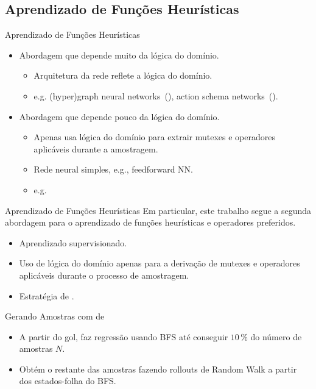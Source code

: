 \documentclass{beamer}
\begin{document}
\subsection{Aprendizado de Funções Heurísticas}
\begin{frame}{Aprendizado de Funções Heurísticas}
\begin{itemize}
  \item Abordagem que depende \alert{muito} da lógica do domínio.
    \begin{itemize}
      \item Arquitetura da rede reflete a lógica do domínio.
      \item e.g. (hyper)graph neural networks~(\cite{Shen.etal/2020,Stahlberg.etal/2022}), action schema networks~(\cite{Toyer.etal/2018,Toyer.etal/2020}).
    \end{itemize}
  \pause
  \item Abordagem que depende \alert{pouco} da lógica do domínio.
    \begin{itemize}
      \item Apenas usa lógica do domínio para extrair mutexes e operadores aplicáveis durante a amostragem.
      \item Rede neural simples, e.g., feedforward NN.
      \item e.g.~\cite{Ferber.etal/2020a,Yu.etal/2020,Ferber.etal/2022,OToole/2022,Bettker.etal/2022}
    \end{itemize}
\end{itemize}
\end{frame}

\begin{frame}{Aprendizado de Funções Heurísticas}
Em particular, este trabalho segue a \alert{segunda abordagem} para o aprendizado de funções heurísticas e operadores preferidos.
\begin{itemize}
  \item Aprendizado supervisionado.
  \item Uso de lógica do domínio apenas para a derivação de mutexes e operadores aplicáveis durante o processo de amostragem.
  \item Estratégia de \alert{\cite{Bettker.etal/2022}}.
\end{itemize}
\end{frame}

\begin{frame}{Gerando Amostras com \bfsrw de \cite{Bettker.etal/2022}}
\begin{itemize}
  \item A partir do gol, faz \alert{regressão} usando \alert{BFS} até conseguir $10\,\%$ do número de amostras $N$.
  \pause
  \item Obtém o restante das amostras fazendo rollouts de \alert{Random Walk} a partir dos \alert{estados-folha} do BFS.
\end{itemize}
\end{frame}
\end{document}
